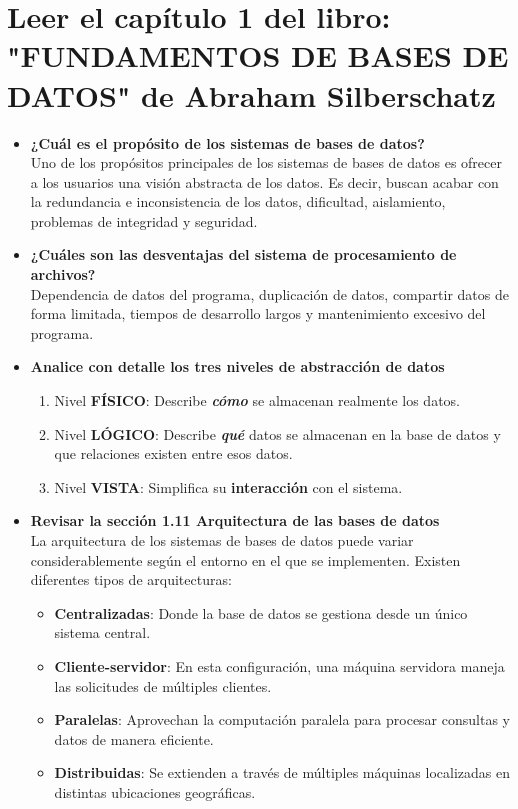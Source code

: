 \documentclass[letterpaper,12pt]{article}
\begin{document}
\begin{sloppypar}
\section*{Leer el capítulo 1 del libro: "FUNDAMENTOS DE BASES DE DATOS" de Abraham Silberschatz}
\begin{itemize}
    \item \textbf{¿Cuál es el propósito de los sistemas de bases de datos?} \\ Uno de los propósitos principales de los sistemas de bases de datos es ofrecer a los usuarios una visión abstracta de los datos. Es decir, buscan acabar con la redundancia e inconsistencia de los datos, dificultad, aislamiento, problemas de integridad y seguridad.
    \item \textbf{¿Cuáles son las desventajas del sistema de procesamiento de archivos?} \\ Dependencia de datos del programa, duplicación de datos, compartir datos de forma limitada, tiempos de desarrollo largos y mantenimiento excesivo del programa.
    \item \textbf{Analice con detalle los tres niveles de abstracción de datos}
    \begin{enumerate}
        \item Nivel \textbf{FÍSICO}: Describe \textbf{\textit{cómo}} se almacenan realmente los datos.
        \item Nivel \textbf{LÓGICO}: Describe \textbf{\textit{qué}} datos se almacenan en la base de datos y que relaciones existen entre esos datos.
        \item Nivel \textbf{VISTA}: Simplifica su \textbf{interacción} con el sistema.
    \end{enumerate}
    \item \textbf{Revisar la sección 1.11 Arquitectura de las bases de datos} \\ 
    La arquitectura de los sistemas de bases de datos puede variar considerablemente según el entorno en el que se implementen. Existen diferentes tipos de arquitecturas:
    \begin{itemize}
        \item \textbf{Centralizadas}: Donde la base de datos se gestiona desde un único sistema central.
        \item \textbf{Cliente-servidor}: En esta configuración, una máquina servidora maneja las solicitudes de múltiples clientes.
        \item \textbf{Paralelas}: Aprovechan la computación paralela para procesar consultas y datos de manera eficiente.
        \item \textbf{Distribuidas}: Se extienden a través de múltiples máquinas localizadas en distintas ubicaciones geográficas.
    \end{itemize}


\end{itemize}
\end{sloppypar}
\end{document}
